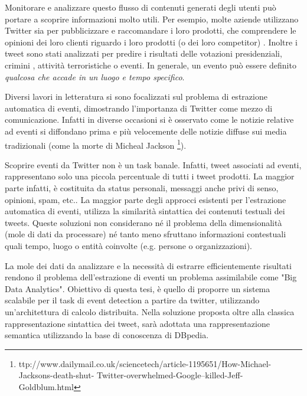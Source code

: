 Monitorare e analizzare questo flusso di  contenuti generati degli utenti può portare a scoprire informazioni molto utili. Per esempio, molte aziende utilizzano Twitter sia per pubblicizzare e raccomandare i loro prodotti, che comprendere  le opinioni dei loro clienti riguardo i loro prodotti (o dei loro competitor) .
Inoltre i tweet sono stati analizzati per predire i risultati delle votazioni presidenziali, crimini \cite{Wang2012}, attività terroristiche o eventi. In generale, un evento può essere definito \emph{qualcosa che accade in un luogo e tempo specifico}. 

Diversi lavori in letteratura si sono focalizzati sul problema di estrazione automatica di eventi, dimostrando l'importanza di Twitter come mezzo di comunicazione. Infatti in diverse occasioni si è osservato come le notizie relative ad eventi si diffondano prima e più velocemente delle notizie diffuse sui media tradizionali (come la morte di Micheal Jackson \footnote{ttp://www.dailymail.co.uk/sciencetech/article-1195651/How-Michael-Jacksons-death-shut- Twitter-overwhelmed-Google–killed-Jeff-Goldblum.html}).

Scoprire eventi da Twitter non è un task banale. Infatti, tweet associati ad  eventi, rappresentano solo una piccola percentuale di tutti i tweet prodotti. La maggior parte infatti, è costituita da status personali, messaggi anche privi di senso, opinioni, spam, etc..   
La maggior parte degli approcci esistenti per l'estrazione automatica di eventi, utilizza la similarità sintattica dei contenuti testuali dei tweets. Queste soluzioni non considerano né il problema della dimensionalità (mole di dati da processare) né tanto meno sfruttano informazioni contestuali quali tempo, luogo o entità coinvolte (e.g. persone o organizzazioni).

La mole dei dati da analizzare e la necessità di estrarre efficientemente risultati rendono il problema dell'estrazione di eventi un problema assimilabile come  "Big Data Analytics".  
Obiettivo di questa tesi, è quello di proporre un sistema scalabile per il task di event detection a partire da twitter, utilizzando un'architettura di calcolo distribuita. Nella soluzione proposta oltre alla classica rappresentazione sintattica dei tweet, sarà adottata una rappresentazione semantica utilizzando la base di conoscenza di DBpedia.


